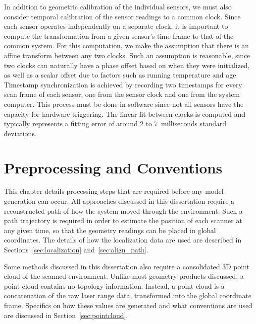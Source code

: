 \documentclass[12pt,onecolumn,oneside]{book}
\begin{document}
In addition to geometric calibration of the individual sensors, we must also consider temporal calibration of the sensor readings to a common clock.  Since each sensor operates independently on a separate clock, it is important to compute the transformation from a given sensor's time frame to that of the common system.  For this computation, we make the assumption that there is an affine transform between any two clocks.  Such an assumption is reasonable, since two clocks can naturally have a phase offset based on when they were initialized, as well as a scalar offset due to factors such as running temperature and age.  Timestamp synchronization is achieved by recording two timestamps for every scan frame of each sensor, one from the sensor clock and one from the system computer.  This process must be done in software since not all sensors have the capacity for hardware triggering.  The linear fit between clocks is computed and typically represents a fitting error of around $2$ to $7$~milliseconds standard deviations.


\chapter{Preprocessing and Conventions}
\label{ch:preprocessing}

This chapter details processing steps that are required before any model generation can occur.  All approaches discussed in this dissertation require a reconstructed path of how the system moved through the environment.  Such a path trajectory is required in order to estimate the position of each scanner at any given time, so that the geometry readings can be placed in global coordinates.  The details of how the localization data are used are described in Sections~\ref{sec:localization} and~\ref{sec:align_path}.

Some methods discussed in this dissertation also require a consolidated 3D point cloud of the scanned environment.  Unlike most geometry products discussed, a point cloud contains no topology information.  Instead, a point cloud is a concatenation of the raw laser range data, transformed into the global coordinate frame.  Specifics on how these values are generated and what conventions are used are discussed in Section~\ref{sec:pointcloud}.
\end{document}
